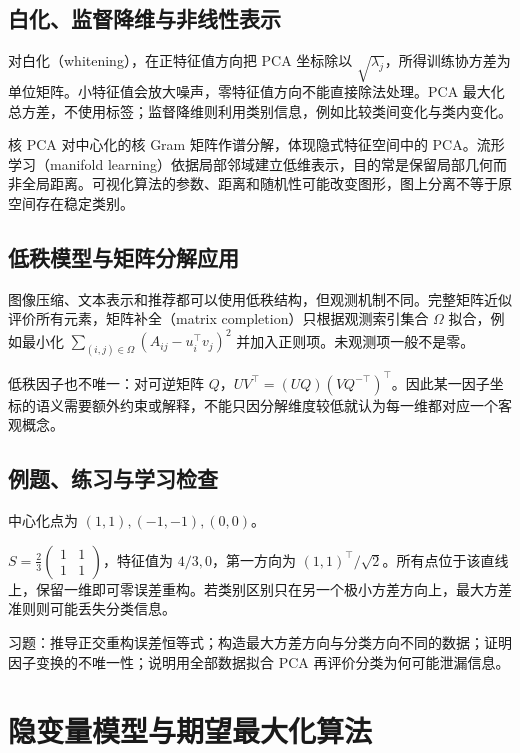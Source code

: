 \documentclass[UTF8,12pt,a4paper,fontset=fandol]{ctexbook}
\begin{document}
\section{白化、监督降维与非线性表示}

对白化（whitening），在正特征值方向把 PCA 坐标除以 $\sqrt{\lambda_j}$，所得训练协方差为单位矩阵。小特征值会放大噪声，零特征值方向不能直接除法处理。PCA 最大化总方差，不使用标签；监督降维则利用类别信息，例如比较类间变化与类内变化。

核 PCA 对中心化的核 Gram 矩阵作谱分解，体现隐式特征空间中的 PCA。流形学习（manifold learning）依据局部邻域建立低维表示，目的常是保留局部几何而非全局距离。可视化算法的参数、距离和随机性可能改变图形，图上分离不等于原空间存在稳定类别。

\section{低秩模型与矩阵分解应用}

图像压缩、文本表示和推荐都可以使用低秩结构，但观测机制不同。完整矩阵近似评价所有元素，矩阵补全（matrix completion）只根据观测索引集合 $\Omega$ 拟合，例如最小化 $\sum_{(i,j)\in\Omega}(A_{ij}-u_i^\top v_j)^2$ 并加入正则项。未观测项一般不是零。

低秩因子也不唯一：对可逆矩阵 $Q$，$UV^\top=(UQ)(VQ^{-\top})^\top$。因此某一因子坐标的语义需要额外约束或解释，不能只因分解维度较低就认为每一维都对应一个客观概念。

\section{例题、练习与学习检查}

\begin{example}[一个主方向]
中心化点为 $(1,1),(-1,-1),(0,0)$。
\end{example}
\begin{solve}
$S=\frac23\left(\begin{smallmatrix}1&1\\1&1\end{smallmatrix}\right)$，特征值为 $4/3,0$，第一方向为 $(1,1)^\top/\sqrt2$。所有点位于该直线上，保留一维即可零误差重构。若类别区别只在另一个极小方差方向上，最大方差准则则可能丢失分类信息。
\end{solve}

习题：推导正交重构误差恒等式；构造最大方差方向与分类方向不同的数据；证明因子变换的不唯一性；说明用全部数据拟合 PCA 再评价分类为何可能泄漏信息。

\chapter{隐变量模型与期望最大化算法}
\label{chap:ml-em}
\end{document}
